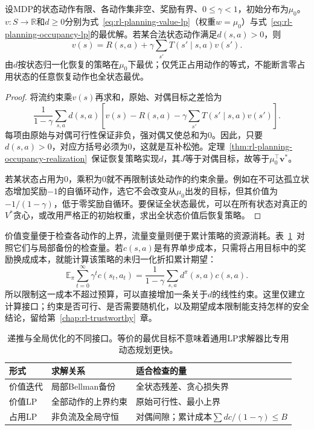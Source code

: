 \begin{theorem}[互补松弛与最优动作]
 \label{thm:rl-planning-complementarity}
 设MDP的状态动作有限、各动作集非空、奖励有界、$0\leq\gamma<1$，初始分布为$\mu_0$。$v:S\to\mathbb R$和$d\geq0$分别为式~\eqref{eq:rl-planning-value-lp}（权重$w=\mu_0$）与式~\eqref{eq:rl-planning-occupancy-lp}的最优解。若某合法状态动作满足$d(s,a)>0$，则
 \[
 v(s)=R(s,a)+\gamma\sum_{s'}T(s'\mid s,a)v(s').
 \]
 由$d$按状态归一化恢复的策略在$\mu_0$下最优；仅凭正占用动作的等式，不能断言零占用状态的任意恢复动作也全状态最优。
\end{theorem}
\begin{proof}
 将流约束乘$v(s)$再求和，原始、对偶目标之差恰为
 \[
 \frac{1}{1-\gamma}\sum_{s,a}d(s,a)
 \left[v(s)-R(s,a)-\gamma\sum_{s'}T(s'\mid s,a)v(s')\right].
 \]
 每项由原始与对偶可行性保证非负，强对偶又使总和为0。因此，只要$d(s,a)>0$，对应方括号必须为0，这就是互补松弛。定理~\ref{thm:rl-planning-occupancy-realization}~保证恢复策略实现$d$，其$J$等于对偶目标，故等于$\mu_0^\top\bm v^*$。

 若某状态占用为0，乘积为0就不再限制该处动作的约束余量。例如在不可达孤立状态增加奖励$-1$的自循环动作，选它不会改变从$\mu_0$出发的目标，但其价值为$-1/(1-\gamma)$，低于零奖励自循环。要保证全状态最优，可以在所有状态对真正的$V^*$贪心，或改用严格正的初始权重，求出全状态价值后恢复策略。
\end{proof}

价值变量便于检查各动作的上界，流量变量则便于累计策略的资源消耗。表~\ref{tab:rl-planning-dp-lp}~对照它们与局部备份的检查量。若$c(s,a)$是有界单步成本，只需将占用目标中的奖励换成成本，就能计算该策略的未归一化折扣累计期望：
\[
 \mathbb E_\pi\sum_{t=0}^{\infty}\gamma^t c(s_t,a_t)
 =\frac{1}{1-\gamma}\sum_{s,a}d^\pi(s,a)c(s,a).
\]
所以限制这一成本不超过预算，可以直接增加一条关于$d$的线性约束。这里仅建立计算接口；约束是否可行、是否需要随机化，以及期望成本限制能支持怎样的安全结论，留给第~\ref{chap:rl-trustworthy}~章。

\begin{table}[htbp]
 \centering
 \small
 \begin{tabularx}{\linewidth}{@{}l>{\raggedright\arraybackslash}X>{\raggedright\arraybackslash}X@{}}
  \toprule
  形式 & 求解关系 & 适合检查的量\\
  \midrule
  价值迭代 & 局部Bellman备份 & 全状态残差、贪心损失界\\
  价值LP & 全部动作的上界约束 & 原始可行性、最小上界\\
  占用LP & 非负流及全局守恒 & 对偶间隙；累计成本$\sum dc/(1-\gamma)\leq B$\\
  \bottomrule
 \end{tabularx}
 \caption{递推与全局优化的不同接口。等价的最优目标不意味着通用LP求解器比专用动态规划更快。}
 \label{tab:rl-planning-dp-lp}
\end{table}

